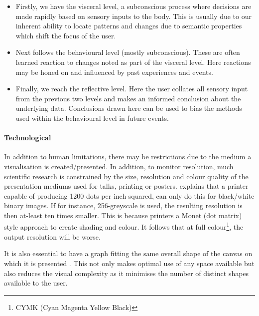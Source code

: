 \begin{itemize}
\item[1.] Firstly, we have the visceral level, a subconscious process where decisions are made rapidly based on sensory inputs to the body. 
This is usually due to our inherent ability to locate patterns and changes due to semantic properties which shift the focus of the user.  

\item[2.] Next follows the behavioural level (mostly subconscious). These are often learned reaction to changes noted as part of the visceral level. Here reactions may be honed on and influenced by past experiences and events. 

\item[3.] Finally, we reach the reflective level. Here the user collates all sensory input from the previous two levels and makes an informed conclusion about the underlying data. Conclusions drawn here can be used to bias the methods used within the behavioural level in future events. 
\end{itemize}

\paragraph{Technological}
In addition to human limitations, there may be restrictions due to the medium a visualisation is created/presented. In addition, to monitor resolution, much scientific research is constrained by the size, resolution and colour quality of the presentation mediums used for talks, printing or posters. \cite{ware} explains that a printer capable of producing 1200 dots per inch squared, can only do this for black/white binary images. If for instance, 256-greyscale is used, the resulting resolution is then at-least ten times smaller. This is because printers a Monet (dot matrix) style approach to create shading and colour. It follows that at full colour\footnote{CYMK (Cyan Magenta Yellow Black)}, the output resolution will be worse. 

It is also essential to have a graph fitting the same overall shape of the canvas on which it is presented \citep{graphmetnew}. This not only makes optimal use of any space available but also reduces the visual complexity as it minimises the number of distinct shapes available to the user. 




 




